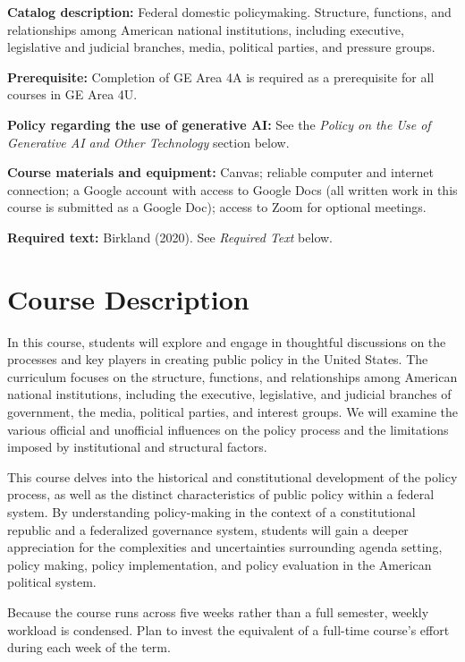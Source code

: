 \documentclass[12pt]{article}
\begin{document}
\vspace{0.5em}
\begin{flatlist}
\item \textbf{Catalog description:} Federal domestic policymaking. Structure, functions, and relationships among American national institutions, including executive, legislative and judicial branches, media, political parties, and pressure groups.
\item \textbf{Prerequisite:} Completion of GE Area 4A is required as a prerequisite for all courses in GE Area 4U.
\item \textbf{Policy regarding the use of generative AI:} See the \emph{Policy on the Use of Generative AI and Other Technology} section below.
\item \textbf{Course materials and equipment:} Canvas; reliable computer and internet connection; a Google account with access to Google Docs (all written work in this course is submitted as a Google Doc); access to Zoom for optional meetings.
\item \textbf{Required text:} Birkland (2020). See \emph{Required Text} below.
\end{flatlist}

\section*{Course Description}

{\setlength{\parindent}{0pt}\setlength{\parskip}{0.6\baselineskip}%
In this course, students will explore and engage in thoughtful discussions on the processes and key players in creating public policy in the United States. The curriculum focuses on the structure, functions, and relationships among American national institutions, including the executive, legislative, and judicial branches of government, the media, political parties, and interest groups. We will examine the various official and unofficial influences on the policy process and the limitations imposed by institutional and structural factors.

This course delves into the historical and constitutional development of the policy process, as well as the distinct characteristics of public policy within a federal system. By understanding policy-making in the context of a constitutional republic and a federalized governance system, students will gain a deeper appreciation for the complexities and uncertainties surrounding agenda setting, policy making, policy implementation, and policy evaluation in the American political system.

Because the course runs across five weeks rather than a full semester, weekly workload is condensed. Plan to invest the equivalent of a full-time course's effort during each week of the term.
}
\end{document}
